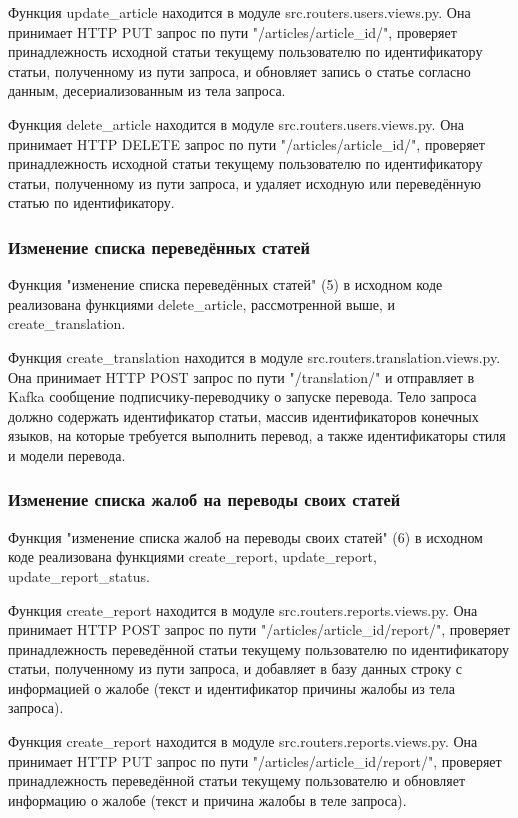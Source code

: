 \documentclass[14pt]{extarticle}
\begin{document}
Функция update\_article находится в модуле src.routers.users.views.py. Она принимает HTTP PUT запрос по пути "/articles/{article\_id}/", проверяет принадлежность исходной статьи текущему пользователю по идентификатору статьи, полученному из пути запроса, и обновляет запись о статье согласно данным, десериализованным из тела запроса.

Функция delete\_article находится в модуле src.routers.users.views.py. Она принимает HTTP DELETE запрос по пути "/articles/{article\_id}/", проверяет принадлежность исходной статьи текущему пользователю по идентификатору статьи, полученному из пути запроса, и удаляет исходную или переведённую статью по идентификатору.

\subsubsection{Изменение списка переведённых статей}

Функция "изменение списка переведённых статей" (5) в исходном коде реализована функциями delete\_article, рассмотренной выше, и create\_translation.

Функция create\_translation находится в модуле src.routers.translation.views.py. Она принимает HTTP POST запрос по пути "/translation/" и отправляет в Kafka сообщение подписчику-переводчику о запуске перевода. Тело запроса должно содержать идентификатор статьи, массив идентификаторов конечных языков, на которые требуется выполнить перевод, а также идентификаторы стиля и модели перевода.

\subsubsection{Изменение списка жалоб на переводы своих статей}

Функция "изменение списка жалоб на переводы своих статей" (6) в исходном коде реализована функциями create\_report, update\_report, update\_report\_status.

Функция create\_report находится в модуле src.routers.reports.views.py. Она принимает HTTP POST запрос по пути "/articles/{article\_id}/report/", проверяет принадлежность переведённой статьи текущему пользователю по идентификатору статьи, полученному из пути запроса, и добавляет в базу данных строку с информацией о жалобе (текст и идентификатор причины жалобы из тела запроса).

Функция create\_report находится в модуле src.routers.reports.views.py. Она принимает HTTP PUT запрос по пути "/articles/{article\_id}/report/", проверяет принадлежность переведённой статьи текущему пользователю и обновляет информацию о жалобе (текст и причина жалобы в теле запроса).
\end{document}
